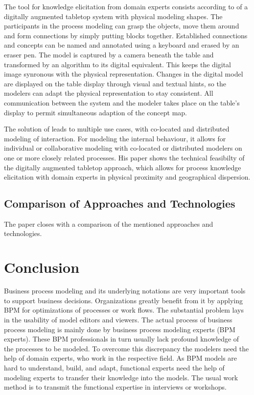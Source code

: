 	The tool for knowledge elicitation from domain experts consists according to  of a digitally augmented tabletop system
	with physical modeling shapes. The participants in the process modeling can grasp the objects, move them around and form connections by
	simply putting blocks together. Established connections and concepts can be named and annotated using a keyboard and erased by an
	eraser pen. The model is captured by a camera beneath the table and transformed by an algorithm to its
	digital equivalent. This keeps the digital image synronous with the physical representation. Changes in the digital model
	are displayed on the table display through visual and textual hints, so the modelers can adapt the physical representation to
	stay consistent. All communication between the system and the modeler takes place on the table's display to permit simultaneous
	adaption of the concept map.
	
	The solution of  leads to multiple use cases, with co-located and distributed modeling of interaction. For modeling 
	the internal behaviour, it allows for individual or collaborative modeling with co-located or distributed modelers on one or more 
	closely related processes. His paper shows the technical feasibilty of the digitally augmented tabletop approach, which allows
	for process knowledge elicitation with domain experts in physical proximity and geographical dispersion.

		
	\subsection{Comparison of Approaches and Technologies}
	The paper closes with a comparison of the mentioned approaches and technologies.
	
\section{Conclusion}

Business process modeling and its underlying notations are very important tools to support
business decisions. Organizations greatly benefit from it by applying BPM for optimizations of processes or work flows.
The substantial problem lays in the usability of model editors and viewers. The actual process of business process modeling is mainly done by business 
process modeling experts (BPM experts). These BPM professionals in turn usually lack profound knowledge 
of the processes to be modeled. To overcome this discrepancy the modelers need the help of domain experts, 
who work in the respective field. As BPM models are hard to understand, build, and adapt, functional experts
need the help of modeling experts to transfer their knowledge into the models. The usual work method is to transmit
the functional expertise in interviews or workshops.


